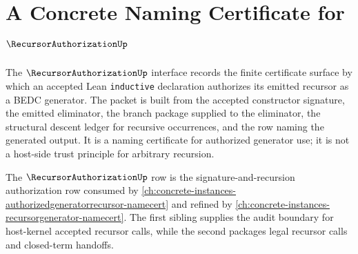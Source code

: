 \chapter{A Concrete Naming Certificate for $\RecursorAuthorizationUp$}
\label{ch:concrete-instances-recursorauthorization-namecert}

The $\RecursorAuthorizationUp$ interface records the finite certificate surface by which an accepted Lean \texttt{inductive} declaration authorizes its emitted recursor as a BEDC generator. The packet is built from the accepted constructor signature, the emitted eliminator, the branch package supplied to the eliminator, the structural descent ledger for recursive occurrences, and the \NameCert{} row naming the generated output. It is a naming certificate for authorized generator use; it is not a host-side trust principle for arbitrary recursion.

The $\RecursorAuthorizationUp$ row is the signature-and-recursion authorization row consumed by \autoref{ch:concrete-instances-authorizedgeneratorrecursor-namecert} and refined by \autoref{ch:concrete-instances-recursorgenerator-namecert}. The first sibling supplies the audit boundary for host-kernel accepted recursor calls, while the second packages legal recursor calls and closed-term handoffs.

